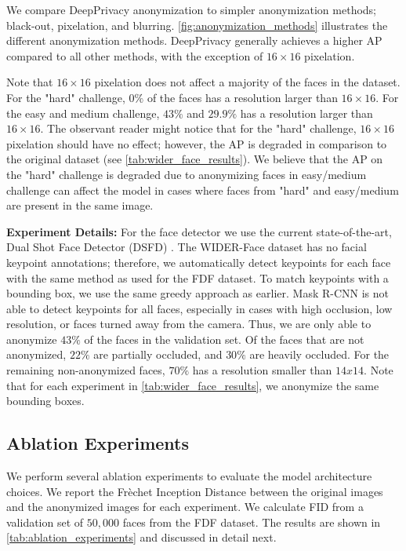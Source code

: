 \documentclass[runningheads]{llncs}
\begin{document}
We compare DeepPrivacy anonymization to simpler anonymization methods; black-out, pixelation, and blurring. \autoref{fig:anonymization_methods} illustrates the different anonymization methods. 
DeepPrivacy generally achieves a higher AP compared to all other methods, with the exception of $16 \times 16$ pixelation.

Note that $16 \times 16$ pixelation does not affect a majority of the faces in the dataset. 
For the "hard" challenge, $0\%$ of the faces has a resolution larger than $16 \times 16$.
For the easy and medium challenge, $43\%$ and $29.9\%$ has a resolution larger than $16 \times 16$.
The observant reader might notice that for the "hard" challenge, $16 \times 16$ pixelation should have no effect; however, the AP is degraded in comparison to the original dataset (see \autoref{tab:wider_face_results}).
We believe that the AP on the "hard" challenge is degraded due to anonymizing faces in easy/medium challenge can affect the model in cases where faces from "hard" and easy/medium are present in the same image.



\textbf{Experiment Details:} For the face detector we use the current state-of-the-art, Dual Shot Face Detector (DSFD) \cite{li2018dsfd}.
The WIDER-Face dataset has no facial keypoint annotations; therefore,
we automatically detect keypoints for each face with the same method as used for the FDF dataset.
To match keypoints with a bounding box, we use the same greedy approach as earlier. 
Mask R-CNN \cite{He2017} is not able to detect keypoints for all faces, especially in cases with high occlusion, low resolution, or faces turned away from the camera.
Thus, we are only able to anonymize $43\%$ of the faces in the validation set.
Of the faces that are not anonymized, $22\%$ are partially occluded, and $30\%$ are heavily occluded. For the remaining non-anonymized faces, $70\%$ has a resolution smaller than $14x14$. Note that for each experiment in \autoref{tab:wider_face_results}, we anonymize the same bounding boxes.


\subsection{Ablation Experiments}


We perform several ablation experiments to evaluate the model architecture choices. We report the Fr\`echet Inception Distance \cite{heusel2017gans} between the original images and the anonymized images for each experiment. 
We calculate FID from a validation set of $50,000$ faces from the FDF dataset.
The results are shown in \autoref{tab:ablation_experiments} and discussed in detail next.
\end{document}
